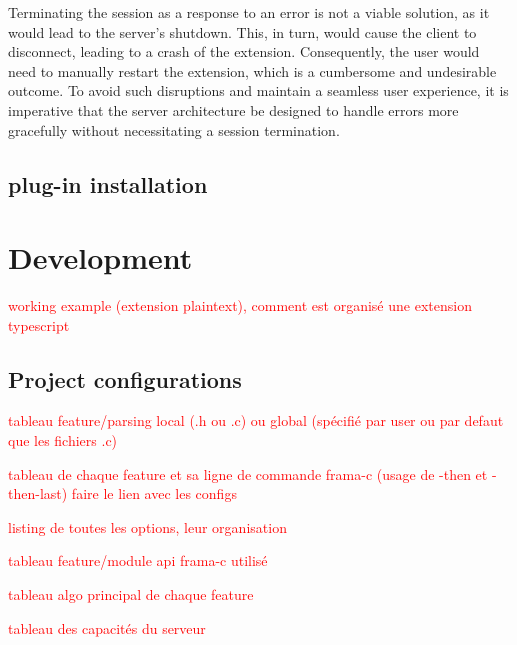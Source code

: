 \documentclass[10pt]{article}
\begin{document}
\begin{singlespace}
Terminating the session as a response to an error is not a viable solution, as it would lead to the server's shutdown. This, in turn, would cause the client to disconnect, leading to a crash of the extension. Consequently, the user would need to manually restart the extension, which is a cumbersome and undesirable outcome. To avoid such disruptions and maintain a seamless user experience, it is imperative that the server architecture be designed to handle errors more gracefully without necessitating a session termination.

\subsection{plug-in installation}



\section{Development}

\textcolor{red}{working example (extension plaintext), comment est organisé une extension typescript}

\subsection{Project configurations}

\textcolor{red}{tableau feature/parsing local (.h ou .c) ou global (spécifié par user ou par defaut que les fichiers .c)}

\textcolor{red}{tableau de chaque feature et sa ligne de commande frama-c (usage de -then et -then-last) faire le lien avec les configs}

\textcolor{red}{listing de toutes les options, leur organisation}

\textcolor{red}{tableau feature/module api frama-c utilisé}

\textcolor{red}{tableau algo principal de chaque feature}

\textcolor{red}{tableau des capacités du serveur}


\end{singlespace}
\end{document}
